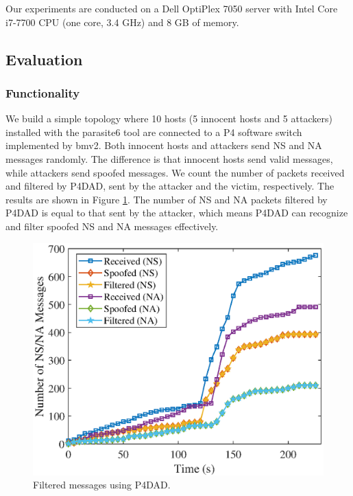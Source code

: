 \documentclass[a4paper,fleqn]{cas-dc}
\begin{document}
        Our experiments are conducted on a Dell OptiPlex 7050 server with Intel Core i7-7700 CPU (one core, 3.4 GHz) and 8 GB of memory.


    \subsection{Evaluation}



        \subsubsection{Functionality}
            We build a simple topology where 10 hosts (5 innocent hosts and 5 attackers) installed with the parasite6 tool are connected to a P4 software switch implemented by bmv2. 
            Both innocent hosts and attackers send NS and NA messages randomly. The difference is that innocent hosts send valid messages, while attackers send spoofed messages.
            We count the number of packets received and filtered by P4DAD, sent by the attacker and the victim, respectively. The results are shown in Figure \ref{fig:P4DAD-filtered}. The number of NS and NA packets filtered by P4DAD is equal to that sent by the attacker, which means P4DAD can recognize and filter spoofed NS and NA messages effectively.
            \begin{figure}
                \centerline{
                    \includegraphics[scale=0.6]{figure/Filtered.eps}
                }
                \caption{Filtered messages using P4DAD.}
                \label{fig:P4DAD-filtered}
            \end{figure}
\end{document}
